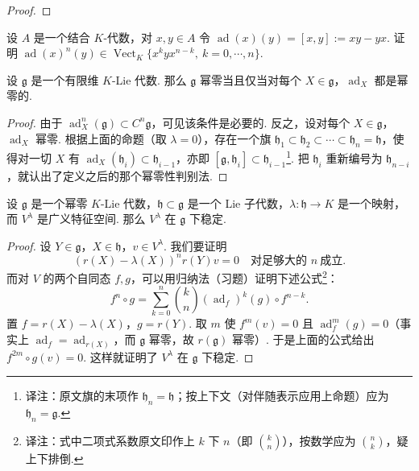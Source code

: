 \begin{numpara}[借助表示论的刻画]
\begin{proof}
\end{proof}
\begin{exercise*}
设 $A$ 是一个结合 $K$-代数，对 $x, y \in A$ 令 $\operatorname{ad}(x)(y) = [x, y] := xy - yx$. 证明 $\operatorname{ad}(x)^n(y) \in \operatorname{Vect}_K\{x^k y x^{n-k},\ k = 0, \cdots, n\}$.
\end{exercise*}
\begin{corollary*}
设 $\mathfrak{g}$ 是一个有限维 $K$-Lie 代数. 那么 $\mathfrak{g}$ 幂零当且仅当对每个 $X \in \mathfrak{g}$，$\operatorname{ad}_X$ 都是幂零的.
\end{corollary*}
\begin{proof}
由于 $\operatorname{ad}^n_X(\mathfrak{g}) \subset C^n\mathfrak{g}$，可见该条件是必要的. 反之，设对每个 $X \in \mathfrak{g}$，$\operatorname{ad}_X$ 幂零. 根据上面的命题（取 $\lambda = 0$），存在一个旗 $\mathfrak{h}_1 \subset \mathfrak{h}_2 \subset \cdots \subset \mathfrak{h}_n = \mathfrak{h}$，使得对一切 $X$ 有 $\operatorname{ad}_X(\mathfrak{h}_i) \subset \mathfrak{h}_{i-1}$，亦即 $[\mathfrak{g}, \mathfrak{h}_i] \subset \mathfrak{h}_{i-1}$\footnote{译注：原文旗的末项作 $\mathfrak{h}_n = \mathfrak{h}$；按上下文（对伴随表示应用上命题）应为 $\mathfrak{h}_n = \mathfrak{g}$.}. 把 $\mathfrak{h}_i$ 重新编号为 $\mathfrak{h}_{n-i}$，就认出了定义之后的那个幂零性判别法.
\end{proof}
\begin{lemma*}
设 $\mathfrak{g}$ 是一个幂零 $K$-Lie 代数，$\mathfrak{h} \subset \mathfrak{g}$ 是一个 Lie 子代数，$\lambda : \mathfrak{h} \longrightarrow K$ 是一个映射，而 $V^{\lambda}$ 是广义特征空间. 那么 $V^{\lambda}$ 在 $\mathfrak{g}$ 下稳定.
\end{lemma*}
\begin{proof}
设 $Y \in \mathfrak{g}$，$X \in \mathfrak{h}$，$v \in V^{\lambda}$. 我们要证明
\[(r(X) - \lambda(X))^n r(Y)v = 0\quad\text{对足够大的 } n\ \text{成立}.\]
而对 $V$ 的两个自同态 $f, g$，可以用归纳法（习题）证明下述公式\footnote{译注：式中二项式系数原文印作上 $k$ 下 $n$（即 $\binom{k}{n}$），按数学应为 $\binom{n}{k}$，疑上下排倒.}：
\[f^n \circ g = \sum_{k=0}^{n} \binom{k}{n} (\operatorname{ad}_f)^k(g) \circ f^{n-k}.\]
置 $f = r(X) - \lambda(X)$，$g = r(Y)$. 取 $m$ 使 $f^m(v) = 0$ 且 $\operatorname{ad}^m_f(g) = 0$（事实上 $\operatorname{ad}_f = \operatorname{ad}_{r(X)}$，而 $\mathfrak{g}$ 幂零，故 $r(\mathfrak{g})$ 幂零）. 于是上面的公式给出 $f^{2m} \circ g(v) = 0$. 这样就证明了 $V^{\lambda}$ 在 $\mathfrak{g}$ 下稳定.
\end{proof}
\begin{theorem*}

\end{theorem*}
\end{numpara}
